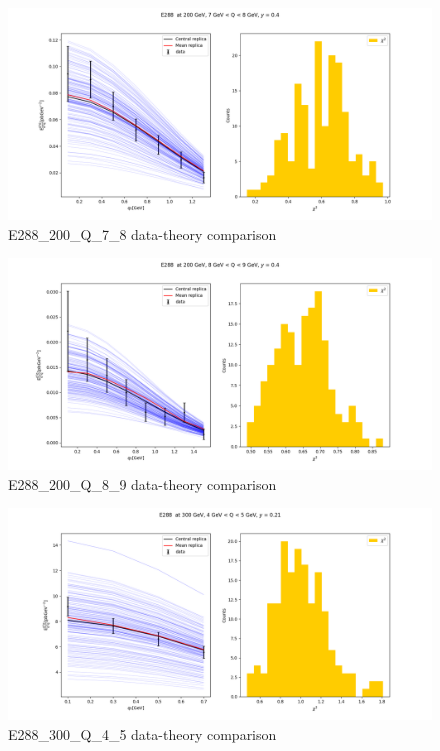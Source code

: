 \documentclass[
]{article}
\begin{document}
\begin{figure}
\centering
\includegraphics{pngplots/E288_200_Q_7_8.png}
\caption{E288\_200\_Q\_7\_8 data-theory comparison}
\end{figure}

\begin{figure}
\centering
\includegraphics{pngplots/E288_200_Q_8_9.png}
\caption{E288\_200\_Q\_8\_9 data-theory comparison}
\end{figure}

\begin{figure}
\centering
\includegraphics{pngplots/E288_300_Q_4_5.png}
\caption{E288\_300\_Q\_4\_5 data-theory comparison}
\end{figure}
\end{document}
